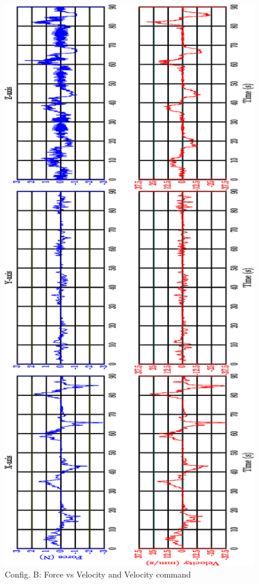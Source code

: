 \begin{figure}[htbp]
\begin{center}
\includegraphics[width=0.7\linewidth]{Images/exp/ConfigB_2.eps}
\caption{Config. B: Force vs Velocity and Velocity command}
\label{fig: exp1_2_2}
\end{center}
\end{figure}

